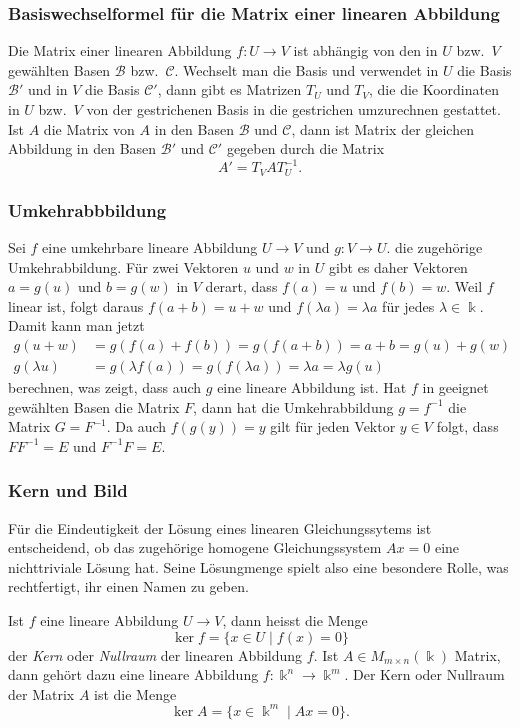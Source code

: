 \subsubsection{Basiswechselformel für die Matrix einer linearen Abbildung}
Die Matrix einer linearen Abbildung $f\colon U\to V$ ist abhängig von den
in $U$ bzw.~$V$ gewählten Basen $\mathcal{B}$ bzw.~$\mathcal{C}$.
Wechselt man die Basis und verwendet in $U$ die Basis $\mathcal{B}'$ und
in $V$ die Basis $\mathcal{C}'$, dann gibt es Matrizen
$T_U$ und $T_V$, die die Koordinaten in $U$ bzw.~$V$ von der gestrichenen
Basis in die gestrichen umzurechnen gestattet.
Ist $A$ die Matrix von $A$ in den Basen $\mathcal{B}$ und $\mathcal{C}$,
dann ist Matrix der gleichen Abbildung in den Basen $\mathcal{B}'$
und $\mathcal{C}'$ gegeben durch die Matrix
\[
A' = T_VAT_U^{-1}.
\]

\subsubsection{Umkehrabbbildung}
Sei $f$ eine umkehrbare lineare Abbildung $U\to V$ und $g\colon V\to U$.
die zugehörige Umkehrabbildung.
%
Für zwei Vektoren $u$ und $w$ in $U$ gibt es daher Vektoren $a=g(u)$
und $b=g(w)$ in $V$ derart, dass $f(a)=u$ und $f(b)=w$.
Weil $f$ linear ist, folgt daraus $f(a+b)=u+w$ und $f(\lambda a)=\lambda a$
für jedes $\lambda\in\Bbbk$.
Damit kann man jetzt
\begin{align*}
g(u+w)&=g(f(a)+f(b)) = g(f(a+b)) = a+b = g(u)+g(w)
\\
g(\lambda u) &= g(\lambda f(a))=g(f(\lambda a)) = \lambda a = \lambda g(u)
\end{align*}
berechnen, was zeigt, dass auch $g$ eine lineare Abbildung ist.
Hat $f$ in geeignet gewählten Basen die Matrix $F$, dann hat die
Umkehrabbildung $g=f^{-1}$ die Matrix $G=F^{-1}$.
Da auch $f(g(y))=y$ gilt für jeden Vektor $y\in V$ folgt, dass $FF^{-1}=E$
und $F^{-1}F=E$.

\subsubsection{Kern und Bild}
Für die Eindeutigkeit der Lösung eines linearen Gleichungssytems
ist entscheidend, ob das zugehörige homogene Gleichungssystem $Ax=0$
eine nichttriviale Lösung hat.
Seine Lösungmenge spielt also eine besondere Rolle, was rechtfertigt,
ihr einen Namen zu geben.

\begin{definition}
%
Ist $f$ eine lineare Abbildung $U\to V$, dann heisst die Menge
\[
\ker f
=
\{x\in U\;|\; f(x)=0\}
\]
der {\em Kern} oder {\em Nullraum} der linearen Abbildung $f$.
%
%
Ist $A \in M_{m\times n}(\Bbbk)$ Matrix, dann gehört dazu eine lineare
Abbildung $f\colon\Bbbk^n\to\Bbbk^m$.
Der Kern oder Nullraum der Matrix $A$ ist die Menge
\[
\ker A
=
\{ x\in\Bbbk^m \;|\; Ax=0\}.
\]
\end{definition}

